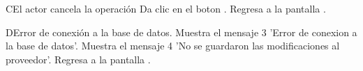 \begin{UCtrayectoriaA}{C}{El actor cancela la operación}
	\UCpaso[\UCactor] Da clic en el boton .			
	\UCpaso[\UCsist] Regresa a la pantalla .
\end{UCtrayectoriaA}

\begin{UCtrayectoriaA}{D}{Error de conexión a la base de datos.}
	\UCpaso[\UCsist] Muestra el mensaje 3 'Error de conexion a la base de datos'.
	\UCpaso[\UCsist] Muestra el mensaje 4 'No se guardaron las modificaciones al proveedor'.		
	\UCpaso[\UCsist] Regresa a la pantalla .
\end{UCtrayectoriaA}


